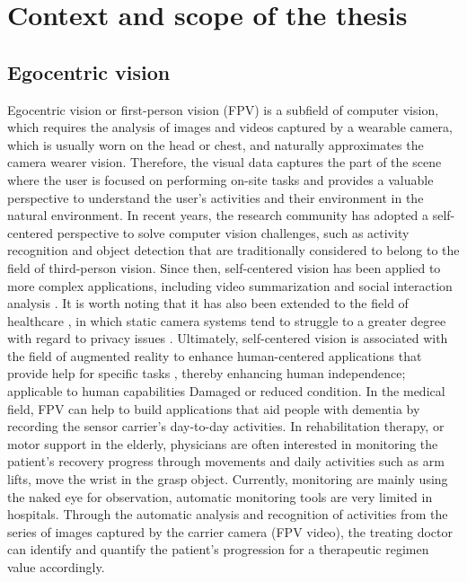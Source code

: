 \section{Context and scope of the thesis}
\subsection{Egocentric vision}
Egocentric vision or first-person vision (FPV) is a subfield of computer vision, which requires the analysis of images and videos captured by a wearable camera, which is usually worn on the head or chest, and naturally approximates the camera wearer vision. Therefore, the visual data captures the part of the scene where the user is focused on performing on-site tasks and provides a valuable perspective to understand the user's activities and their environment in the natural environment.
In recent years, the research community has adopted a self-centered perspective to solve computer vision challenges, such as activity recognition \cite{10.1109/ICCV.2011.6126269} and object detection \cite{5995444} that are traditionally considered to belong to the field of third-person vision. Since then, self-centered vision has been applied to more complex applications, including video summarization \cite{6247820} and social interaction analysis \cite{7780657}. It is worth noting that it has also been extended to the field of healthcare \cite{wearable}, in which static camera systems tend to struggle to a greater degree with regard to privacy issues \cite{6091176}. Ultimately, self-centered vision is associated with the field of augmented reality to enhance human-centered applications that provide help for specific tasks \cite{10.1145/3041164.3041185}, thereby enhancing human independence; applicable to human capabilities Damaged or reduced condition.
In the medical field, FPV can help to build applications that aid people with dementia by recording the sensor carrier's day-to-day activities. In rehabilitation therapy, or motor support in the elderly, physicians are often interested in monitoring the patient's recovery progress through movements and daily activities such as arm lifts, move the wrist in the grasp object. Currently, monitoring are mainly using the naked eye for observation, automatic monitoring tools are very limited in hospitals. Through the automatic analysis and recognition of activities from the series of images captured by the carrier camera (FPV video), the treating doctor can identify and quantify the patient's progression for a therapeutic regimen value accordingly.

